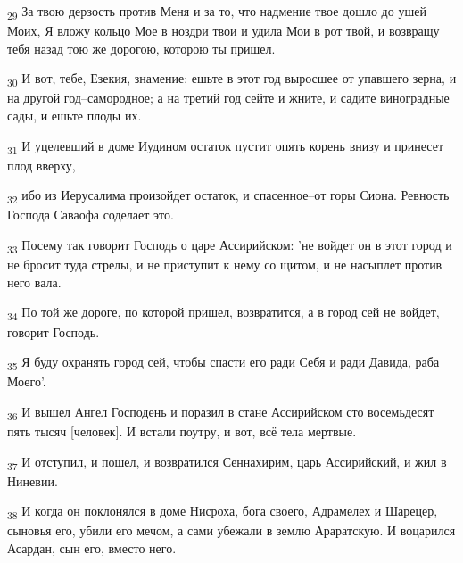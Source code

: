 \begin{tcolorbox}
\textsubscript{29} За твою дерзость против Меня и за то, что надмение твое дошло до ушей Моих, Я вложу кольцо Мое в ноздри твои и удила Мои в рот твой, и возвращу тебя назад тою же дорогою, которою ты пришел.
\end{tcolorbox}
\begin{tcolorbox}
\textsubscript{30} И вот, тебе, Езекия, знамение: ешьте в этот год выросшее от упавшего зерна, и на другой год--самородное; а на третий год сейте и жните, и садите виноградные сады, и ешьте плоды их.
\end{tcolorbox}
\begin{tcolorbox}
\textsubscript{31} И уцелевший в доме Иудином остаток пустит опять корень внизу и принесет плод вверху,
\end{tcolorbox}
\begin{tcolorbox}
\textsubscript{32} ибо из Иерусалима произойдет остаток, и спасенное--от горы Сиона. Ревность Господа Саваофа соделает это.
\end{tcolorbox}
\begin{tcolorbox}
\textsubscript{33} Посему так говорит Господь о царе Ассирийском: 'не войдет он в этот город и не бросит туда стрелы, и не приступит к нему со щитом, и не насыплет против него вала.
\end{tcolorbox}
\begin{tcolorbox}
\textsubscript{34} По той же дороге, по которой пришел, возвратится, а в город сей не войдет, говорит Господь.
\end{tcolorbox}
\begin{tcolorbox}
\textsubscript{35} Я буду охранять город сей, чтобы спасти его ради Себя и ради Давида, раба Моего'.
\end{tcolorbox}
\begin{tcolorbox}
\textsubscript{36} И вышел Ангел Господень и поразил в стане Ассирийском сто восемьдесят пять тысяч [человек]. И встали поутру, и вот, всё тела мертвые.
\end{tcolorbox}
\begin{tcolorbox}
\textsubscript{37} И отступил, и пошел, и возвратился Сеннахирим, царь Ассирийский, и жил в Ниневии.
\end{tcolorbox}
\begin{tcolorbox}
\textsubscript{38} И когда он поклонялся в доме Нисроха, бога своего, Адрамелех и Шарецер, сыновья его, убили его мечом, а сами убежали в землю Араратскую. И воцарился Асардан, сын его, вместо него.
\end{tcolorbox}
